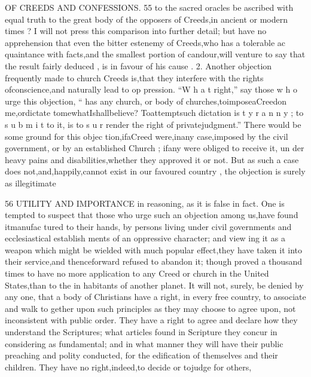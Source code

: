 \documentclass[
]{book}
\begin{document}
OF CREEDS AND CONFESSIONS. 55
to the sacred oracles be ascribed with equal truth to the great body of the opposers of Creeds,in ancient or modern times ? I will not press this comparison into further detail; but have no apprehension that even the bitter estenemy of Creeds,who has a tolerable ac
quaintance with facts,and the smallest portion of candour,will venture to say that the result fairly deduced , is in favour of his cause .
2. Another objection frequently made to church Creeds is,that they interfere with the rights ofconscience,and naturally lead to op pression. ``W h a t right,'' say those w h o urge
this objection, `` has any church, or body of churches,toimposeaCreedon me,ordictate tomewhatIshallbelieve? Toattemptsuch dictation is t y r a n n y ; to s u b m i t to it, is to s u r render the right of privatejudgment.''
There would be some ground for this objec tion,ifaCreed were,inany case,imposed by the civil government, or by an established Church ; ifany were obliged to receive it, un
der heavy pains and disabilities,whether they approved it or not. But as such a case does
not,and,happily,cannot exist in our favoured country , the objection is surely as illegitimate

56 UTILITY AND IMPORTANCE
in reasoning, as it is false in fact. One is
tempted to suspect that those who urge such an objection among us,have found itmanufac tured to their hands, by persons living under civil governments and ecclesiastical establish ments of an oppressive character; and view ing it as a weapon which might be wielded with much popular effect,they have taken it into their service,and thenceforward refused to abandon it; though proved a thousand times to have no more application to any Creed or
church in the United States,than to the in habitants of another planet.
It will not, surely, be denied by any one,
that a body of Christians have a right, in every free country, to associate and walk to
gether upon such principles as they may choose to agree upon, not inconsistent with public order. They have a right to agree and declare how they understand the Scriptures; what articles found in Scripture they concur in considering as fundamental; and in what manner they will have their public preaching and polity conducted, for the edification of themselves and their children. They have no
right,indeed,to decide or tojudge for others,
\end{document}
